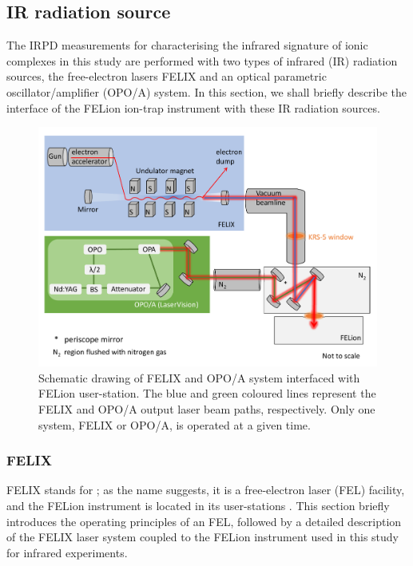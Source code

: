 \subsection{IR radiation source}
\label{subsec:ir:radiation-source}

The IRPD measurements for characterising the infrared signature of ionic complexes in this study are performed with two types of infrared (IR) radiation sources, the free-electron lasers FELIX and an optical parametric oscillator/amplifier (OPO/A) system. In this section, we shall briefly describe the interface of the FELion ion-trap instrument with these IR radiation sources.

\begin{figure}[!htb]
    \centering

    \includegraphics[width=1\textwidth]{figures/Instruments/FELIX-OPO-beamline.pdf}
    \caption{Schematic drawing of FELIX and OPO/A system interfaced with FELion user-station. The blue and green coloured lines represent the FELIX and OPO/A output laser beam paths, respectively. Only one system, FELIX or OPO/A, is operated at a given time.}
    \label{fig:FELIX}
\end{figure}

\subsubsection{FELIX} 
\label{subsec:ir:radiation-source:FELIX}

FELIX stands for ; as the name suggests, it is a free-electron laser (FEL) facility, and the FELion instrument is located in its user-stations \cite{jusko_felion_2019}. This section briefly introduces the operating principles of an FEL, followed by a detailed description of the FELIX laser system coupled to the FELion instrument used in this study for infrared experiments.\\

